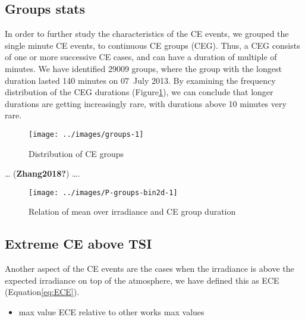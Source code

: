 \documentclass[
]{article}
\providecommand{\tightlist}{%
  \setlength{\itemsep}{0pt}\setlength{\parskip}{0pt}}
\begin{document}
\FloatBarrier

\hypertarget{groups-stats}{%
\subsection{Groups stats}\label{groups-stats}}

In order to further study the characteristics of the CE events, we grouped the single
minute CE events, to continuous CE groups (CEG). Thus, a CEG consists of one or more
successive CE cases, and can have a duration of multiple of minutes. We have
identified 29009 groups, where the group with the longest duration lasted
140 minutes on
07~July 2013.
By examining the frequency distribution of the CEG durations
(Figure\nobreakspace{}\ref{fig:ceg-duration-distribution}), we can conclude that
longer durations are getting increasingly rare, with durations above 10 minutes very
rare.

\begin{figure}[h!]

{\centering \texttt{[image: ../images/groups-1]} 

}

\caption{Distribution of CE groups}\label{fig:ceg-duration-distribution}
\end{figure}

\ldots{} (\textbf{Zhang2018?}) \ldots.

\begin{figure}[h!]

{\centering \texttt{[image: ../images/P-groups-bin2d-1]} 

}

\caption{Relation of mean over irradiance and CE group duration}\label{fig:unnamed-chunk-3}
\end{figure}

\FloatBarrier

\hypertarget{extreme-ce-above-tsi}{%
\subsection{Extreme CE above TSI}\label{extreme-ce-above-tsi}}

Another aspect of the CE events are the cases when the irradiance is above the
expected irradiance on top of the atmosphere, we have defined this as ECE
(Equation\nobreakspace{}\ref{eq:ECE}).

\begin{itemize}
\tightlist
\item
  max value ECE
  relative to other works max values
\end{itemize}
\end{document}
